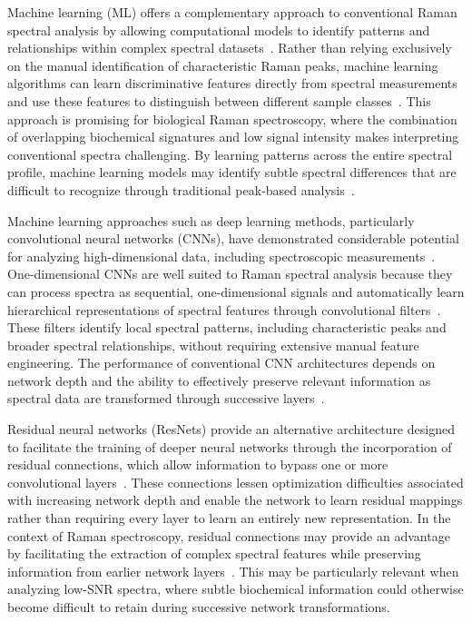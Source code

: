 \documentclass[journal,onecolumn]{IEEEtran}
\begin{document}
Machine learning (ML) offers a complementary approach to conventional Raman
spectral analysis by allowing computational models to identify patterns and
relationships within complex spectral datasets~\cite{liu2017deep}. Rather than
relying exclusively on the manual identification of characteristic Raman
peaks, machine learning algorithms can learn discriminative features directly
from spectral measurements and use these features to distinguish between
different sample classes~\cite{kazemzadeh2022deep}. This approach is promising
for biological Raman spectroscopy, where the combination of overlapping
biochemical signatures and low signal intensity makes interpreting conventional
spectra challenging. By learning patterns across the entire spectral profile,
machine learning models may identify subtle spectral differences that are
difficult to recognize through traditional peak-based analysis~\cite{luo2022deep}.

Machine learning approaches such as deep learning methods, particularly
convolutional neural networks (CNNs), have demonstrated considerable potential
for analyzing high-dimensional data, including spectroscopic
measurements~\cite{liu2017deep}. One-dimensional CNNs are well suited to Raman
spectral analysis because they can process spectra as sequential,
one-dimensional signals and automatically learn hierarchical representations of
spectral features through convolutional filters~\cite{kazemzadeh2022deep}.
These filters identify local spectral patterns, including characteristic
peaks and broader spectral relationships, without requiring extensive manual
feature engineering. The performance of conventional CNN architectures
depends on network depth and the ability to effectively preserve relevant
information as spectral data are transformed through successive
layers~\cite{zhao2023conincedeep}.

Residual neural networks (ResNets) provide an alternative architecture
designed to facilitate the training of deeper neural networks through the
incorporation of residual connections, which allow information to bypass one
or more convolutional layers~\cite{he2016deep}. These connections lessen
optimization difficulties associated with increasing network depth and enable
the network to learn residual mappings rather than requiring every layer to
learn an entirely new representation. In the context of Raman spectroscopy,
residual connections may provide an advantage by facilitating the extraction
of complex spectral features while preserving information from earlier network
layers~\cite{he2016deep,luo2022deep}. This may be particularly relevant when analyzing
low-SNR spectra, where subtle biochemical information could otherwise become
difficult to retain during successive network transformations.
\end{document}

